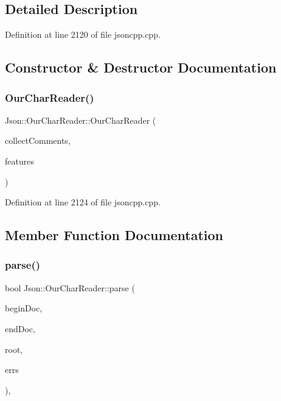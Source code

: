 \subsection{Detailed Description}


Definition at line 2120 of file jsoncpp.\+cpp.



\subsection{Constructor \& Destructor Documentation}
\hypertarget{class_json_1_1_our_char_reader_a5015506620e7ba7bab417756fa1ca9fe}{}\label{class_json_1_1_our_char_reader_a5015506620e7ba7bab417756fa1ca9fe} 
\subsubsection{\texorpdfstring{Our\+Char\+Reader()}{OurCharReader()}}
{\footnotesize\ttfamily Json\+::\+Our\+Char\+Reader\+::\+Our\+Char\+Reader (\begin{DoxyParamCaption}\item[{bool}]{collect\+Comments,  }\item[{\hyperlink{class_json_1_1_our_features}{Our\+Features} const \&}]{features }\end{DoxyParamCaption})\hspace{0.3cm}{\ttfamily [inline]}}



Definition at line 2124 of file jsoncpp.\+cpp.



\subsection{Member Function Documentation}
\hypertarget{class_json_1_1_our_char_reader_a547f08ec5a9951ca69e8bb2e90296c83}{}\label{class_json_1_1_our_char_reader_a547f08ec5a9951ca69e8bb2e90296c83} 
\subsubsection{\texorpdfstring{parse()}{parse()}}
{\footnotesize\ttfamily bool Json\+::\+Our\+Char\+Reader\+::parse (\begin{DoxyParamCaption}\item[{char const $\ast$}]{begin\+Doc,  }\item[{char const $\ast$}]{end\+Doc,  }\item[{\hyperlink{class_json_1_1_value}{Value} $\ast$}]{root,  }\item[{\hyperlink{config_8h_a1e723f95759de062585bc4a8fd3fa4be}{J\+S\+O\+N\+C\+P\+P\+\_\+\+S\+T\+R\+I\+NG} $\ast$}]{errs }\end{DoxyParamCaption})\hspace{0.3cm}{\ttfamily [inline]}, {\ttfamily [virtual]}}



